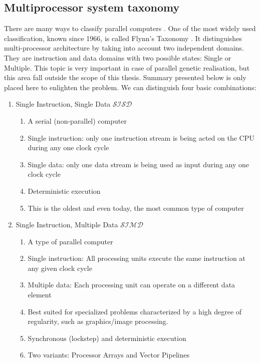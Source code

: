 \subsection{Multiprocessor system taxonomy}
\label{cha:MultiprocessorTaxonomy}
There are many ways to classify parallel computers \cite{bib20}. One of the most widely used
classification, known since 1966, is called Flynn's Taxonomy \cite{bib15}. It distinguishes
multi-processor architecture by taking into account two independent domains.
They are instruction and data domains with two possible states: Single or Multiple. This topic is
very important in case of parallel genetic realisation, but this area fall
outside the scope of this thesis. Summary presented
below is only placed here to enlighten the problem.
We can distinguish four basic combinations:
\begin{enumerate}
	\item Single Instruction, Single Data $\mathcal{SISD}$
		\begin{enumerate}
			\item A serial (non-parallel) computer 
			\item Single instruction: only one instruction stream is being acted on the CPU during any one clock cycle 
			\item Single data: only one data stream is being used as input during any one clock cycle 
			\item Deterministic execution 
			\item This is the oldest and even today, the most common type of computer 
		\end{enumerate}
	\item Single Instruction, Multiple Data $\mathcal{SIMD}$
		\begin{enumerate}
			\item A type of parallel computer 
			\item Single instruction: All processing units execute the same instruction at any given 
				clock cycle 
			\item Multiple data: Each processing unit can operate on a different data element 
			\item Best suited for specialized problems characterized by a high degree of regularity, 
				  such as graphics/image processing. 
			\item Synchronous (lockstep) and deterministic execution 
			\item Two variants: Processor Arrays and Vector Pipelines 
		\end{enumerate}

\end{enumerate}
